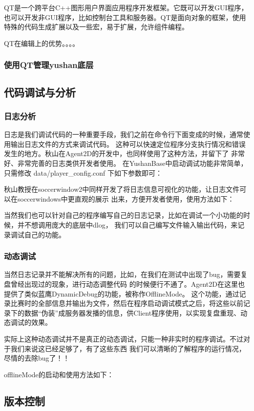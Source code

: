 QT是一个跨平台C++图形用户界面应用程序开发框架。它既可以开发GUI程序，也可以开发非GUI程序，比如控制台工具和服务器。QT是面向对象的框架，使用特殊的代码生成扩展以及一些宏，易于扩展，允许组件编程。

QT在编辑上的优势。。。。
\subsubsection{使用QT管理yushan底层}

\subsection{代码调试与分析}

\subsubsection{日志分析}
日志是我们调试代码的一种重要手段，我们之前在命令行下面变成的时候，通常使用输出日志文件的方式来调试代码。
这种可以快速定位程序分支执行情况和错误发生的地方。秋山在Agent2D的开发中，也同样使用了这种方法，并留下了
非常好、非常完善的日志类供开发者使用。
在YushanBase中启动调试功能非常简单，只需修改 data/player_config.conf 下如下参数即可：

秋山教授在soccerwindow2中同样开发了将日志信息可视化的功能，让日志文件可以在soccerwindows中更直观的展示
出来，方便开发者使用，使用方法如下：

当然我们也可以针对自己的程序编写自己的日志记录，比如在调试一个小功能的时候，并不想调用庞大的底层中dlog，
我们可以自己编写文件输入输出代码，来记录调试自己的功能。
\subsubsection{动态调试}
当然日志记录并不能解决所有的问题，比如，在我们在测试中出现了bug，需要复盘曾经出现过的现象，进行动态调整代码
的时候便行不通了。Agent2D在这里也提供了类似蓝鹰DynamicDebug的功能，被称作OfflineMode。
这个功能，通过记录比赛时的全部信息并输出为文件，然后在程序启动调试模式之后，将这些以前记录下的数据“伪装”成服务器发播的信息，供Client程序使用，以实现复盘重现、动态调试的效果。

实际上这种动态调试并不是真正的动态调试，只能一种非实时的程序调试。不过对于我们来说这已经足够了，有了这些东西
我们可以清晰的了解程序的运行情况，尽情的去除bug了！！

offlineMode的启动和使用方法如下：
\subsection{版本控制}

